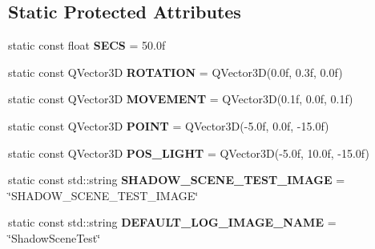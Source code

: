 \subsection*{Static Protected Attributes}
\begin{DoxyCompactItemize}
\item 
\mbox{\label{class_unit_test_1_1_c_shadow_scene_test_a5900558120db2a03e0c92c9fa00d7280}} 
static const float {\bfseries S\+E\+CS} = 50.\+0f
\item 
\mbox{\label{class_unit_test_1_1_c_shadow_scene_test_a1f12a970d2370275d2efb0ced7242788}} 
static const Q\+Vector3D {\bfseries R\+O\+T\+A\+T\+I\+ON} = Q\+Vector3D(0.\+0f, 0.\+3f, 0.\+0f)
\item 
\mbox{\label{class_unit_test_1_1_c_shadow_scene_test_a4eb5492e456b57b4a8c1459476824a40}} 
static const Q\+Vector3D {\bfseries M\+O\+V\+E\+M\+E\+NT} = Q\+Vector3D(0.\+1f, 0.\+0f, 0.\+1f)
\item 
\mbox{\label{class_unit_test_1_1_c_shadow_scene_test_aab8a2e57c38671d832311ef217e11bff}} 
static const Q\+Vector3D {\bfseries P\+O\+I\+NT} = Q\+Vector3D(-\/5.\+0f, 0.\+0f, -\/15.\+0f)
\item 
\mbox{\label{class_unit_test_1_1_c_shadow_scene_test_a60c4d3eb077426f316d6e02b5e87be3b}} 
static const Q\+Vector3D {\bfseries P\+O\+S\+\_\+\+L\+I\+G\+HT} = Q\+Vector3D(-\/5.\+0f, 10.\+0f, -\/15.\+0f)
\item 
\mbox{\label{class_unit_test_1_1_c_shadow_scene_test_a7db81bf784108d6b5c77cc2c430e0961}} 
static const std\+::string {\bfseries S\+H\+A\+D\+O\+W\+\_\+\+S\+C\+E\+N\+E\+\_\+\+T\+E\+S\+T\+\_\+\+I\+M\+A\+GE} = \char`\"{}S\+H\+A\+D\+O\+W\+\_\+\+S\+C\+E\+N\+E\+\_\+\+T\+E\+S\+T\+\_\+\+I\+M\+A\+GE\char`\"{}
\item 
\mbox{\label{class_unit_test_1_1_c_shadow_scene_test_a3170a359a427f0edf8cefe3d88cfb028}} 
static const std\+::string {\bfseries D\+E\+F\+A\+U\+L\+T\+\_\+\+L\+O\+G\+\_\+\+I\+M\+A\+G\+E\+\_\+\+N\+A\+ME} = \char`\"{}Shadow\+Scene\+Test\char`\"{}
\end{DoxyCompactItemize}



